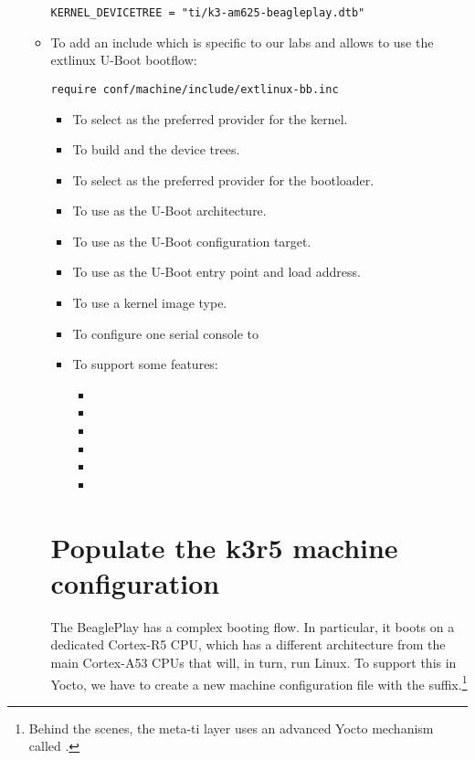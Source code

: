 \begin{itemize}
\begin{itemize}
\begin{verbatim}
KERNEL_DEVICETREE = "ti/k3-am625-beagleplay.dtb"
\end{verbatim}
  \item To add an include which is specific to our labs
  and allows to use the extlinux U-Boot bootflow:
\begin{verbatim}
require conf/machine/include/extlinux-bb.inc
\end{verbatim}
  \else
\begin{itemize}
  \item To select  as the preferred provider
    for the kernel.
  \item To build  and the
     device trees.
  \item To select  as the preferred provider
    for the bootloader.
  \item To use  as the U-Boot architecture.
  \item To use  as the U-Boot
    configuration target.
  \item To use  as the U-Boot entry point and load
    address.
  \item To use a  kernel image type.
  \item To configure one serial console to 
  \item To support some features:
    \begin{itemize}
      \item {}
      \item {}
      \item {}
      \item {}
      \item {}
      \item {}
    \end{itemize}
  \fi
\fi
\end{itemize}

\if{}
\section{Populate the k3r5 machine configuration}

The BeaglePlay has a complex booting flow. In particular, it boots on a dedicated Cortex-R5 CPU,
 which has a different architecture from the main Cortex-A53 CPUs that will, in turn, run Linux.
 To support this in Yocto, we have to create a new machine configuration file with the 
suffix.\footnote{Behind the scenes, the meta-ti layer uses an advanced Yocto mechanism called .}


\end{itemize}
\end{itemize}
